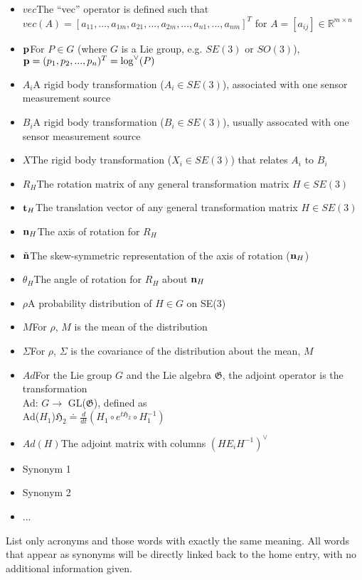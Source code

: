 \documentclass{llncs}
\newcommand{\nn}{{\bf n}}
\newcommand{\ttt}{{\bf t}}
\renewcommand{\section}[1]{\vspace{0.1in}\noindent{\large\bf{#1}}\par\vspace{.05in}\par\nopagebreak}
\begin{document}
\begin{itemize}
\item{$vec$}{The ``vec'' operator is defined such that $vec(A) = [a_{11},...,a_{1m},a_{21},...,a_{2m},...,a_{n1},...,a_{nm}]^{T}$ for $A = [a_{ij}] \in \mathbb{R}^{m \times n}$}
\item{${\bf p}$}{For $P\in G$ (where $G$ is a Lie group, e.g. $SE(3)$ or $SO(3)$), ${\bf p}=(p_1,p_2,...,p_n)^T=\log^{\vee}(P)$}
\item{$A_i$}{A rigid body transformation ($A_i \in SE(3)$), associated with one sensor measurement source}
\item{$B_i$}{A rigid body transformation ($B_i \in SE(3)$), usually assocated with one sensor measurement source}
\item{$X$}{The rigid body transformation ($X_i \in SE(3)$) that relates $A_i$ to $B_i$}
\item{$R_{H}$}{The rotation matrix of any general transformation matrix $H \in SE(3)$}
\item{$\ttt_{H}$}{The translation vector of any general transformation matrix $H \in SE(3)$}
\item{$\nn_{H}$}{The axis of rotation for $R_{H}$}
\item{$\tilde{\nn}$}{The skew-symmetric representation of the axis of rotation ($\nn_{H}$)}
\item{$\theta_{H}$}{The angle of rotation for $R_{H}$ about $\nn_{H}$}
\item{$\rho$}{A probability distribution of $H\in G$ on SE(3)}
\item{$M$}{For $\rho$, $M$ is the mean of the distribution}
\item{$\Sigma$}{For $\rho$, $\Sigma$ is the covariance of the distribution about the mean, $M$}
\item{$Ad$}{For the Lie group $G$ and the Lie algebra $\mathfrak{G}$, the adjoint operator is the transformation\\ Ad: $G \rightarrow$ GL($\mathfrak{G}$), defined as\\ Ad($H_1$)$\mathfrak{H}_2 \doteq \frac{d}{dt}(H_1 \circ e^{t \mathfrak{H}_2} \circ H_1^{-1})$}
\item{$Ad(H) $}{The adjoint matrix with columns $(H E_i H^{-1})^{\vee}$}
\end{itemize}



\section{Synonyms}
\begin{itemize}
\item{Synonym 1}
\item{Synonym 2}
\item{...}
\end{itemize}
List only acronyms and those words with exactly the same meaning. All 
words that appear as synonyms will be directly linked back to the home 
entry, with no additional information given.
\end{document}
